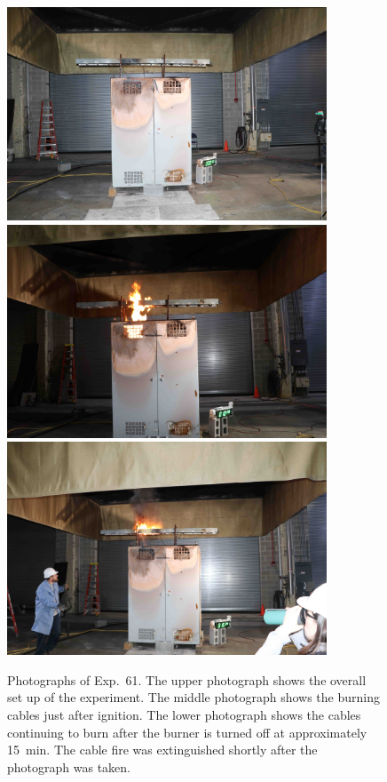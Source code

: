 \begin{figure}[p]
\centering
\includegraphics[height=2.50in]{../FIGURES/Test_61_setup} \\ \vspace{0.1in}
\includegraphics[height=2.50in]{../FIGURES/Test_61_10_min_28_s} \\ \vspace{0.1in}
\includegraphics[height=2.50in]{../FIGURES/Test_61_15_min_34_s}
\caption[Photographs of Exp.~61]{Photographs of Exp.~61. The upper photograph shows the overall set up of the experiment. The middle photograph shows the burning cables just after ignition. The lower photograph shows the cables continuing to burn after the burner is turned off at approximately 15~min. The cable fire was extinguished shortly after the photograph was taken. }
\label{fig:Test_61_photos}
\end{figure}


